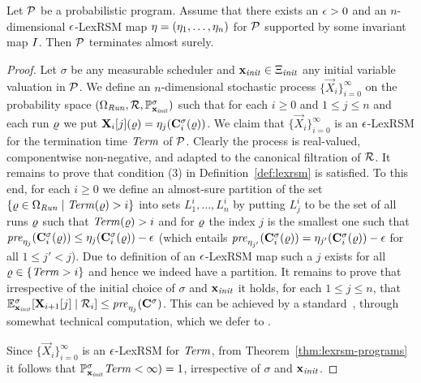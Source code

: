 \begin{theorem}
\label{thm:lexrsm-programs}
Let $\mathcal{P}$ be a probabilistic program. Assume that there exists an $\epsilon>0$ 
and an $n$-dimensional $\epsilon$-LexRSM map $\mathbf{\eta}=(\eta_1,\dots,\eta_n)$ for 
$\mathcal{P}$ supported 
by some 
invariant map $I$. 
Then $\mathcal{P}$ terminates almost surely.
\end{theorem}
\begin{proof}
Let $\sigma$ be any measurable scheduler and $\mathbf{x}_{\mathit{init}}\in\Xi_{\mathit{init}}$ any 
initial variable valuation in $\mathcal{P}$.
We define an $n$-dimensional stochastic process 
$\{\vec{X}_{i}\}_{i=0}^{\infty} $ on the probability space 
$(\Omega_{\mathit{Run}},\mathcal{R},\mathbb{P}^{\sigma}_{\mathbf{x}_{\mathit{init}}})$ such 
that for each 
$i\geq 0$ and $1\leq j 
\leq n$ and each run $\varrho$ we put $\mathbf{X}_{i}[j](\varrho) = 
\eta_j(\mathbf{C}^{\sigma}_{i}(\varrho))$. We claim that $\{\vec{X}_{i}\}_{i=0}^{\infty}$ 
is an $\epsilon$-LexRSM for the termination time $\mathit{Term}$ of $\mathcal{P}$. Clearly 
the process is real-valued, componentwise non-negative, and adapted to the 
canonical filtration of $\mathcal{R}$. It remains to prove that condition (3) in 
Definition~\ref{def:lexrsm} is satisfied. To this end, for each $i\geq 0$ we 
define an almost-sure partition of the set $\{\varrho\in \Omega_{\mathit{Run}}\mid 
\mathit{Term}(\varrho) >i\}$ into sets $L^{i}_1,\dots,L^{i}_n$ by putting $L^i_j$ to be 
the set of all runs $\varrho$ such that $\mathit{Term}(\varrho)>i$ and for $\varrho$ the index 
$j$ is the smallest one such that $\mathit{pre}_{\eta_j}(\mathbf{C}^{\sigma}_{i}(\varrho)) \leq 
\eta_j(\mathbf{C}^{\sigma}_{i}(\varrho))-\epsilon$ (which entails 
$\mathit{pre}_{\eta_{j'}}(\mathbf{C}^{\sigma}_{i}(\varrho)) =
\eta_{j'}(\mathbf{C}^{\sigma}_{i}(\varrho))-\epsilon$ for all $1\leq j'< j$). Due to 
definition of an $\epsilon$-LexRSM map such a $j$ exists for all 
$\varrho\in\{\mathit{Term}>i\}$ and hence we indeed have a partition. It remains to prove 
that irrespective of the initial choice of $\sigma$ and $\mathbf{x}_{\mathit{init}}$ it holds, 
for each $1\leq j 
\leq n$, that $\mathbb{E}^\sigma_{\mathbf{x}_{\mathit{init}}}[\mathbf{X}_{i+1}[j]\mid 
\mathcal{R}_i]\leq\mathit{pre}_{\eta_{j}}(\mathbf{C}^{\sigma}_{}) $. This can be achieved by a 
standard~\cite{xxx}, through somewhat technical computation, which we defer to 
\AppendixMaterial.

Since  $\{\vec{X}_{i}\}_{i=0}^{\infty}$ 
is an $\epsilon$-LexRSM for $\mathit{Term}$, from Theorem~\ref{thm:lexrsm-programs} it 
follows that $\mathbb{P}^{\sigma}_{\mathbf{x}_{\mathit{init}}}\mathit{Term} <\infty) =1$, irrespective of 
$\sigma$ and $\mathbf{x}_{\mathit{init}}$.
\end{proof} 



